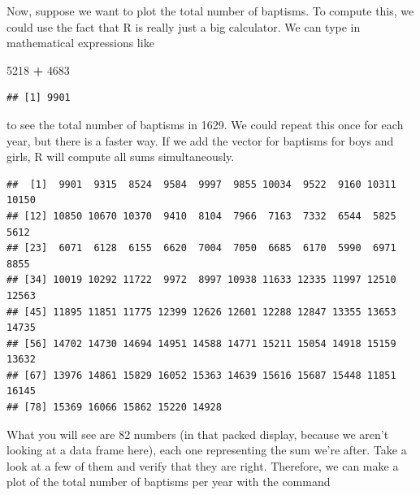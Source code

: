\documentclass[]{article}
\newenvironment{Shaded}{\begin{snugshade}}{\end{snugshade}}
\newcommand{\KeywordTok}[1]{\textcolor[rgb]{0.13,0.29,0.53}{\textbf{#1}}}
\newcommand{\DataTypeTok}[1]{\textcolor[rgb]{0.13,0.29,0.53}{#1}}
\newcommand{\DecValTok}[1]{\textcolor[rgb]{0.00,0.00,0.81}{#1}}
\newcommand{\StringTok}[1]{\textcolor[rgb]{0.31,0.60,0.02}{#1}}
\newcommand{\OperatorTok}[1]{\textcolor[rgb]{0.81,0.36,0.00}{\textbf{#1}}}
\newcommand{\NormalTok}[1]{#1}
\begin{document}
Now, suppose we want to plot the total number of baptisms. To compute
this, we could use the fact that R is really just a big calculator. We
can type in mathematical expressions like

\begin{Shaded}
\begin{Highlighting}[]
\DecValTok{5218} \OperatorTok{+}\StringTok{ }\DecValTok{4683}
\end{Highlighting}
\end{Shaded}

\begin{verbatim}
## [1] 9901
\end{verbatim}

to see the total number of baptisms in 1629. We could repeat this once
for each year, but there is a faster way. If we add the vector for
baptisms for boys and girls, R will compute all sums simultaneously.

\begin{Shaded}
\end{Shaded}

\begin{verbatim}
##  [1]  9901  9315  8524  9584  9997  9855 10034  9522  9160 10311 10150
## [12] 10850 10670 10370  9410  8104  7966  7163  7332  6544  5825  5612
## [23]  6071  6128  6155  6620  7004  7050  6685  6170  5990  6971  8855
## [34] 10019 10292 11722  9972  8997 10938 11633 12335 11997 12510 12563
## [45] 11895 11851 11775 12399 12626 12601 12288 12847 13355 13653 14735
## [56] 14702 14730 14694 14951 14588 14771 15211 15054 14918 15159 13632
## [67] 13976 14861 15829 16052 15363 14639 15616 15687 15448 11851 16145
## [78] 15369 16066 15862 15220 14928
\end{verbatim}

What you will see are 82 numbers (in that packed display, because we
aren't looking at a data frame here), each one representing the sum
we're after. Take a look at a few of them and verify that they are
right. Therefore, we can make a plot of the total number of baptisms per
year with the command

\begin{Shaded}
\end{Shaded}
\end{document}
